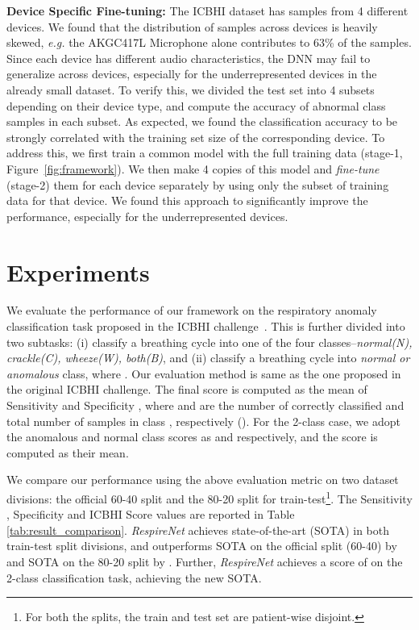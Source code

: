 \documentclass{article}
\newcommand{\method}{\textit{RespireNet}}
\begin{document}
\smallskip\noindent\textbf{Device Specific Fine-tuning:} The ICBHI dataset has samples from 4 different devices. We found that the distribution of samples across devices is heavily skewed, \textit{e.g.} the AKGC417L Microphone alone contributes to 63\% of the samples. Since each device has different audio characteristics, the DNN may fail to generalize across devices, especially for the underrepresented devices in the already small dataset. To verify this, we divided the test set into 4 subsets depending on their device type, and compute the accuracy of abnormal class samples in each subset. As expected, we found the classification accuracy to be strongly correlated with the training set size of the corresponding device.
To address this, we first train a common model with the full training data (stage-1, Figure~\ref{fig:framework}). We then make 4 copies of this model and \textit{fine-tune} (stage-2) them for each device separately by using only the subset of training data for that device. We found this approach to significantly improve the performance, especially for the underrepresented devices. \vspace{-2mm}
\section{Experiments}
\vspace{-2mm}

We evaluate the performance of our framework on the respiratory anomaly classification task proposed in the ICBHI challenge~\cite{icbhi_17}. This is further divided into two subtasks: (i) classify a breathing cycle into one of the four classes--\textit{normal(N), crackle(C), wheeze(W), both(B)}, and (ii) classify a breathing cycle into \textit{normal or anomalous} class, where .
Our evaluation method is same as the one proposed in the original ICBHI challenge. The final score is computed as the mean of Sensitivity  and Specificity , where  and  are the number of correctly classified and total number of samples in class , respectively ().
For the 2-class case, we adopt the anomalous and normal class scores as  and  respectively, and the score is computed as their mean.

We compare our performance using the above evaluation metric on two dataset divisions: the official 60-40 split \cite{icbhi_17} and the 80-20 split \cite{lungbrn_19, lungrn_20, acharya_20} for train-test\footnote{For both the splits, the train and test set are patient-wise disjoint.}. The Sensitivity , Specificity  and ICBHI Score values are reported in Table \ref{tab:result_comparison}. \method{} achieves state-of-the-art (SOTA) in both train-test split divisions, and outperforms SOTA \cite{lungrn_20} on the official split (60-40) by  and SOTA \cite{acharya_20} on the 80-20 split by . Further, \method{} achieves a score of  on the 2-class classification task, achieving the new SOTA.
\end{document}
